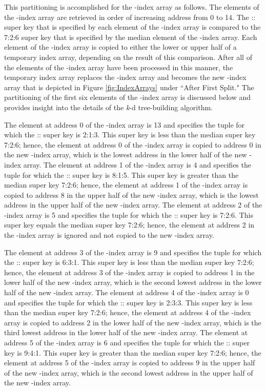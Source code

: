 \documentclass{sig-alternate}
\begin{document}
This partitioning is accomplished for the -index array as follows.  The elements of the -index array are retrieved in order of increasing address from 0 to 14.  The :: super key that is specified by each element of the -index array is compared to the 7:2:6 super key that is specified by the median element of the -index array.  Each element of the -index array is copied to either the lower or upper half of a temporary index array, depending on the result of this comparison.  After all of the elements of the -index array have been processed in this manner, the temporary index array replaces the -index array and becomes the new -index array that is depicted in Figure \ref{fig:IndexArrays} under ``After First Split."  The partitioning of the first six elements of the -index array is discussed below and provides insight into the details of the \emph{k}-d tree-building algorithm.

The element at address 0 of the -index array is 13 and specifies the tuple  for which the :: super key is 2:1:3.  This super key is less than the median super key 7:2:6; hence, the element at address 0 of the -index array is copied to address 0 in the new -index array, which is the lowest address in the lower half of the new -index array.  The element at address 1 of the -index array is 4 and specifies the tuple  for which the :: super key is 8:1:5.  This super key is greater than the median super key 7:2:6; hence, the element at address 1 of the -index array is copied to address 8 in the upper half of the new -index array, which is the lowest address in the upper half of the new -index array.  The element at address 2 of the -index array is 5 and specifies the tuple  for which the :: super key is 7:2:6.  This super key equals the median super key 7:2:6; hence, the element at address 2 in the -index array is ignored and not copied to the new -index array.

The element at address 3 of the -index array is 9 and specifies the tuple  for which the :: super key is 6:3:1.  This super key is less than the median super key 7:2:6; hence, the element at address 3 of the -index array is copied to address 1 in the lower half of the new -index array, which is the second lowest address in the lower half of the new -index array.  The element at address 4 of the -index array is 0 and specifies the tuple  for which the :: super key is 2:3:3.  This super key is less than the median super key 7:2:6; hence, the element at address 4 of the -index array is copied to address 2 in the lower half of the new -index array, which is the third lowest address in the lower half of the new -index array.  The element at address 5 of the -index array is 6 and specifies the tuple  for which the :: super key is 9:4:1.  This super key is greater than the median super key 7:2:6; hence, the element at address 5 of the -index array is copied to address 9 in the upper half of the new -index array, which is the second lowest address in the upper half of the new -index array.
\end{document}
